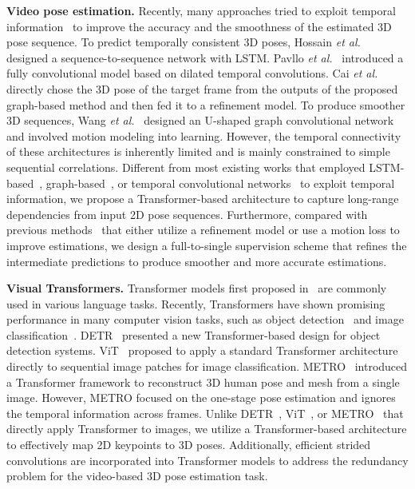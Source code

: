 \documentclass[journal]{IEEEtran}
\begin{document}
\textbf{Video pose estimation.}
Recently, many approaches tried to exploit temporal information~\cite{rayat2018exploiting,pavllo20193d,cai2019exploiting,wang2020motion} to improve the accuracy and the smoothness of the estimated 3D pose sequence. 
To predict temporally consistent 3D poses, Hossain \emph{et al.}~\cite{rayat2018exploiting} designed a sequence-to-sequence network with LSTM. 
Pavllo \emph{et al.}~\cite{pavllo20193d} introduced a fully convolutional model based on dilated temporal convolutions. 
Cai \emph{et al.}~\cite{cai2019exploiting} directly chose the 3D pose of the target frame from the outputs of the proposed graph-based method and then fed it to a refinement model. 
To produce smoother 3D sequences, Wang \emph{et al.}~\cite{wang2020motion} designed an U-shaped graph convolutional network and involved motion modeling into learning. 
However, the temporal connectivity of these architectures is inherently limited and is mainly constrained to simple sequential correlations. 
Different from most existing works that employed LSTM-based~\cite{rayat2018exploiting}, graph-based~\cite{cai2019exploiting,wang2020motion}, or temporal convolutional networks~\cite{pavllo20193d,liu2020attention,chen2021anatomy} to exploit temporal information, we propose a Transformer-based architecture to capture long-range dependencies from input 2D pose sequences. 
Furthermore, compared with previous methods~\cite{cai2019exploiting,wang2020motion} that either utilize a refinement model or use a motion loss to improve estimations, we design a full-to-single supervision scheme that refines the intermediate predictions to produce smoother and more accurate estimations. 

\textbf{Visual Transformers.}
Transformer models first proposed in~\cite{Attention} are commonly used in various language tasks. 
Recently, Transformers have shown promising performance in many computer vision tasks, such as object detection~\cite{carion2020end,zhu2020deformable} and image classification~\cite{dosovitskiy2020image,yuan2021tokens}. 
DETR~\cite{carion2020end} presented a new Transformer-based design for object detection systems. 
ViT~\cite{dosovitskiy2020image} proposed to apply a standard Transformer architecture directly to sequential image patches for image classification. 
METRO~\cite{lin2020end} introduced a Transformer framework to reconstruct 3D human pose and mesh from a single image. 
However, METRO focused on the one-stage pose estimation and ignores the temporal information across frames. 
Unlike DETR~\cite{carion2020end}, ViT~\cite{dosovitskiy2020image}, or METRO~\cite{lin2020end} that directly apply Transformer to images, we utilize a Transformer-based architecture to effectively map 2D keypoints to 3D poses. 
Additionally, efficient strided convolutions are incorporated into Transformer models to address the redundancy problem for the video-based 3D pose estimation task. 
\end{document}
